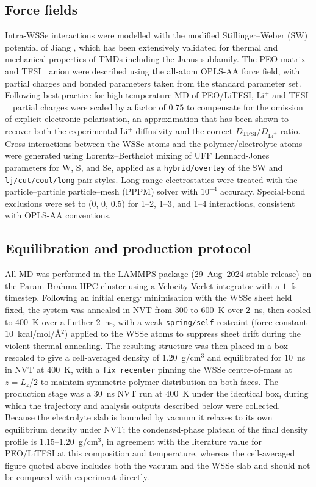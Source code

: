\documentclass[review, 12pt]{elsarticle}
\numberwithin{equation}{section}
\newcommand{\WSSe}{WSSe\xspace}
\newcommand{\LiTFSI}{LiTFSI\xspace}
\begin{document}
\subsection{Force fields}
Intra-WSSe interactions were modelled with the modified Stillinger--Weber (SW) potential of Jiang \cite{jiang_amss_2019_sw}, which has been extensively validated for thermal and mechanical properties of TMDs including the Janus subfamily. The PEO matrix and TFSI$^-$ anion were described using the all-atom OPLS-AA force field, with partial charges and bonded parameters taken from the standard parameter set. Following best practice for high-temperature MD of PEO/\LiTFSI \cite{gudla_jpcb_2020_polarity}, Li$^+$ and TFSI$^-$ partial charges were scaled by a factor of $0.75$ to compensate for the omission of explicit electronic polarisation, an approximation that has been shown to recover both the experimental Li$^+$ diffusivity and the correct $D_{\mathrm{TFSI}}/D_{\mathrm{Li}^+}$ ratio. Cross interactions between the WSSe atoms and the polymer/electrolyte atoms were generated using Lorentz--Berthelot mixing of UFF Lennard-Jones parameters for W, S, and Se, applied as a \texttt{hybrid/overlay} of the SW and \texttt{lj/cut/coul/long} pair styles. Long-range electrostatics were treated with the particle--particle particle--mesh (PPPM) solver with $10^{-4}$ accuracy. Special-bond exclusions were set to (0, 0, 0.5) for 1--2, 1--3, and 1--4 interactions, consistent with OPLS-AA conventions.

\subsection{Equilibration and production protocol}
All MD was performed in the LAMMPS package (29~Aug~2024 stable release) on the Param Brahma HPC cluster using a Velocity-Verlet integrator with a $1$~fs timestep. Following an initial energy minimisation with the WSSe sheet held fixed, the system was annealed in NVT from $300$ to $600$~K over $2$~ns, then cooled to $400$~K over a further $2$~ns, with a weak \texttt{spring/self} restraint (force constant $10$~kcal/mol/\AA$^2$) applied to the WSSe atoms to suppress sheet drift during the violent thermal annealing. The resulting structure was then placed in a box rescaled to give a cell-averaged density of $1.20$~g/cm$^3$ and equilibrated for $10$~ns in NVT at $400$~K, with a \texttt{fix recenter} pinning the WSSe centre-of-mass at $z = L_z/2$ to maintain symmetric polymer distribution on both faces. The production stage was a $30$~ns NVT run at $400$~K under the identical box, during which the trajectory and analysis outputs described below were collected. Because the electrolyte slab is bounded by vacuum it relaxes to its own equilibrium density under NVT; the condensed-phase plateau of the final density profile is $1.15$--$1.20$~g/cm$^3$, in agreement with the literature value for PEO/\LiTFSI at this composition and temperature, whereas the cell-averaged figure quoted above includes both the vacuum and the \WSSe slab and should not be compared with experiment directly.
\end{document}
